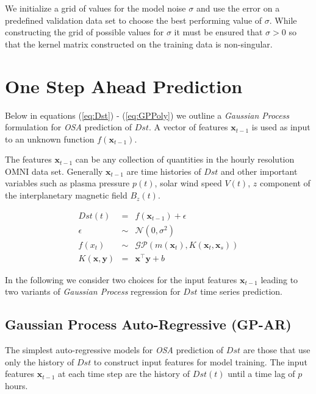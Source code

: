 \documentclass[draft,sw]{AGUTeX}
\begin{document}
\begin{article}
We initialize a grid of values for the model noise $\sigma$ and use the error on a predefined validation data set to choose the best performing value of $\sigma$. While constructing the grid of possible values for $\sigma$ it must be ensured that $\sigma > 0$ so that the kernel matrix constructed on the training data is non-singular.

\section{One Step Ahead Prediction} \label{sec:osa}

Below in equations (\ref{eq:Dst}) - (\ref{eq:GPPoly}) we outline a \emph{Gaussian Process} formulation for \emph{OSA} prediction of $Dst$. A vector of features $\mathbf{x}_{t-1}$ is used as input to an unknown function $f(\mathbf{x}_{t-1})$.

The features $\mathbf{x}_{t-1}$ can be any collection of quantities in the hourly resolution OMNI data set. Generally $\mathbf{x}_{t-1}$ are time histories of $Dst$ and other important variables such as plasma pressure $p(t)$, solar wind speed $V(t)$, $z$ component of the interplanetary magnetic field $B_z(t)$.

\begin{align}
    Dst(t) & = & f(\mathbf{x}_{t-1}) + \epsilon \label{eq:Dst} \\
    \epsilon & \sim & \mathcal{N}(0, \sigma^2) \label{eq:GPNoise} \\
    f(x_t) & \sim & \mathcal{GP}(m(\mathbf{x}_t), K(\mathbf{x}_t, \mathbf{x}_s)) \label{eq:DstGP} \\
    K(\mathbf{x}, \mathbf{y}) & = & \mathbf{x}^\intercal \mathbf{y} + b \label{eq:GPPoly}
\end{align}

In the following we consider two choices for the input features $\mathbf{x}_{t-1}$ leading to two variants of \emph{Gaussian Process} regression for $Dst$ time series prediction.

\subsection{Gaussian Process Auto-Regressive (GP-AR)} \label{sec:gpar}

The simplest auto-regressive models for \emph{OSA} prediction of $Dst$ are those that use only the history of $Dst$ to construct input features for model training. The input features $\mathbf{x}_{t-1}$ at each time step are the history of $Dst(t)$ until a time lag of $p$ hours.


\end{article}
\end{document}
